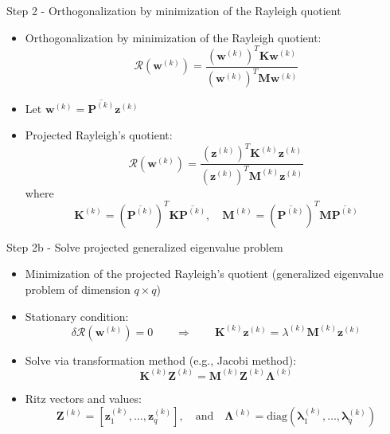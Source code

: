 \documentclass[aspectratio=169]{beamer}
\begin{document}
\begin{frame}{Step 2 - Orthogonalization by minimization of the Rayleigh quotient}
  \begin{itemize}
    \item Orthogonalization by minimization of the Rayleigh quotient:
          \[
            \mathcal R(\mathbf w^{(k)}) = \frac{(\mathbf w^{(k)})^T\mathbf  K \mathbf w^{(k)}}{(\mathbf w^{(k)})^T\mathbf  M\mathbf  w^{(k)}}
          \]
    \item Let \(\mathbf  w^{(k)} = \overline{\mathbf P^{(k)}}\mathbf z^{(k)} \)
    \item Projected Rayleigh's quotient:
          \[
            \mathcal R(\mathbf w^{(k)}) = \frac{(\mathbf z^{(k)})^T\mathbf K^{(k)} \mathbf z^{(k)}}{(\mathbf z^{(k)})^T\mathbf M^{(k)}\mathbf z^{(k)}}
          \]
          where
          \[
            \mathbf K^{(k)} = (\overline{\mathbf P^{(k)}})^T \mathbf K \overline{\mathbf P^{(k)}}, \quad\mathbf M^{(k)} = (\overline{\mathbf P^{(k)}})^T\mathbf M \overline{\mathbf P^{(k)}}
          \]
  \end{itemize}
\end{frame}

\begin{frame}{Step 2b - Solve projected generalized eigenvalue problem}
  \begin{itemize}
    \item Minimization of the projected Rayleigh's quotient (generalized eigenvalue problem of dimension \( q \times q \))
    \item Stationary condition:
          \[
            \delta \mathcal R(\mathbf w^{(k)}) = 0\qquad \Rightarrow\qquad \mathbf K^{(k)} \mathbf z^{(k)} = \lambda^{(k)}\mathbf  M^{(k)}\mathbf  z^{(k)}
          \]

    \item Solve via transformation method (e.g., Jacobi method):
          \[
            \mathbf K^{(k)} \mathbf Z^{(k)} =\mathbf  M^{(k)}\mathbf  Z^{(k)} \mathbf \Lambda^{(k)}
          \]
    \item Ritz vectors and values:
          \[
            \mathbf Z^{(k)} = [\mathbf z_1^{(k)}, \dots,\mathbf  z_q^{(k)}], \quad\text{and}\quad
            \mathbf \Lambda^{(k)} = \text{diag}(\mathbf \lambda_1^{(k)}, \dots, \mathbf \lambda_q^{(k)})
          \]
  \end{itemize}
\end{frame}
\end{document}
